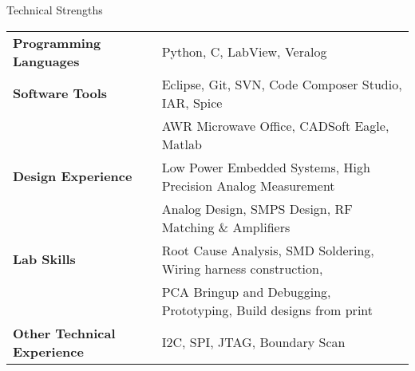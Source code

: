 \documentclass{resume} %
\begin{document}
\begin{rSection}{Technical Strengths}

\begin{tabular}{ @{} >{\bfseries}l @{\hspace{6ex}} l }
Programming Languages & Python, C, LabView, Veralog \smallskip \\

Software Tools & Eclipse, Git, SVN, Code Composer Studio, IAR, Spice\\ 
 & AWR Microwave Office, CADSoft Eagle, Matlab \smallskip \\

Design Experience & Low Power Embedded Systems, High Precision Analog Measurement \\ 
 & Analog Design, SMPS Design, RF Matching \& Amplifiers \smallskip \\
 
Lab Skills & Root Cause Analysis, SMD Soldering, Wiring harness construction,\\
 & PCA Bringup and Debugging, Prototyping, Build designs from print\smallskip \\
 
Other Technical Experience & I2C, SPI, JTAG, Boundary Scan \\
\end{tabular}

\end{rSection}
\medskip

\end{document}
